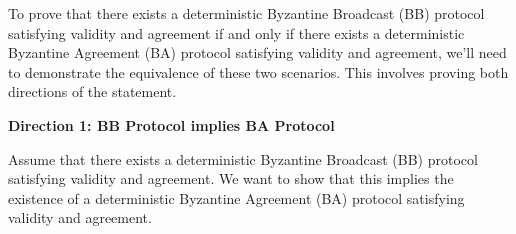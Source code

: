 \documentclass{article}
\begin{document}
\begin{enumerate}









To prove that there exists a deterministic Byzantine Broadcast (BB) protocol satisfying validity and agreement if and only if there exists a deterministic Byzantine Agreement (BA) protocol satisfying validity and agreement, we'll need to demonstrate the equivalence of these two scenarios. This involves proving both directions of the statement.

\textbf{Direction 1: BB Protocol implies BA Protocol}

Assume that there exists a deterministic Byzantine Broadcast (BB) protocol satisfying validity and agreement. We want to show that this implies the existence of a deterministic Byzantine Agreement (BA) protocol satisfying validity and agreement.


\end{enumerate}
\end{document}
